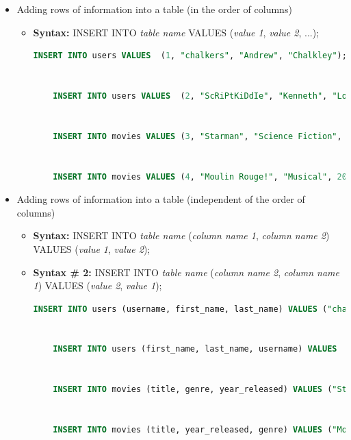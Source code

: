 \documentclass[12pt]{article}
\begin{document}
\begin{itemize}
    \item Adding rows of information into a table (in the order of columns)
    \begin{itemize}
        \item \textbf{Syntax:} INSERT INTO \textit{table name} VALUES (\textit{value 1}, \textit{value 2}, ...);

    \begin{lstlisting}[language=SQL]
    INSERT INTO users VALUES  (1, "chalkers", "Andrew", "Chalkley");


    INSERT INTO users VALUES  (2, "ScRiPtKiDdIe", "Kenneth", "Love");


    INSERT INTO movies VALUES (3, "Starman", "Science Fiction", 1984);


    INSERT INTO movies VALUES (4, "Moulin Rouge!", "Musical", 2001);
    \end{lstlisting}

    \end{itemize}

    \item Adding rows of information into a table (independent of the order of columns)
    \begin{itemize}
        \item \textbf{Syntax:} INSERT INTO \textit{table name} (\textit{column name 1}, \textit{column name 2}) VALUES (\textit{value 1}, \textit{value 2});
        \item \textbf{Syntax \# 2:} INSERT INTO \textit{table name} (\textit{column name 2}, \textit{column name 1}) VALUES (\textit{value 2}, \textit{value 1});

    \begin{lstlisting}[language=SQL]
    INSERT INTO users (username, first_name, last_name) VALUES ("chalkers", "Andrew", "Chalkley");


    INSERT INTO users (first_name, last_name, username) VALUES  ("Kenneth", "Love", "ScRiPtKiDdIe");


    INSERT INTO movies (title, genre, year_released) VALUES ("Starman", "Science Fiction", 1984);


    INSERT INTO movies (title, year_released, genre) VALUES ("Moulin Rouge!", 2001,  "Musical");
    \end{lstlisting}

    \end{itemize}
\end{itemize}

\bigskip
\end{document}
